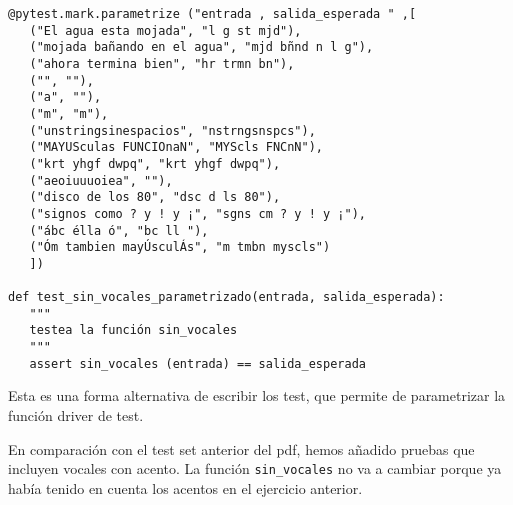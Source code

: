\begin{lstlisting}
@pytest.mark.parametrize ("entrada , salida_esperada " ,[
   ("El agua esta mojada", "l g st mjd"),
   ("mojada bañando en el agua", "mjd bñnd n l g"),
   ("ahora termina bien", "hr trmn bn"),
   ("", ""),
   ("a", ""),
   ("m", "m"),
   ("unstringsinespacios", "nstrngsnspcs"),
   ("MAYUSculas FUNCIOnaN", "MYScls FNCnN"),
   ("krt yhgf dwpq", "krt yhgf dwpq"),
   ("aeoiuuuoiea", ""),
   ("disco de los 80", "dsc d ls 80"),
   ("signos como ? y ! y ¡", "sgns cm ? y ! y ¡"),
   ("ábc élla ó", "bc ll "),
   ("Óm tambien mayÚsculÁs", "m tmbn myscls")
   ])

def test_sin_vocales_parametrizado(entrada, salida_esperada):
   """
   testea la función sin_vocales
   """
   assert sin_vocales (entrada) == salida_esperada
\end{lstlisting}

Esta es una forma alternativa de escribir los test, que permite de parametrizar la función driver de test.

En comparación con el test set anterior del pdf, hemos añadido pruebas que incluyen vocales con acento. La función \lstinline|sin_vocales| no va a cambiar porque ya había tenido en cuenta los acentos en el ejercicio anterior.



